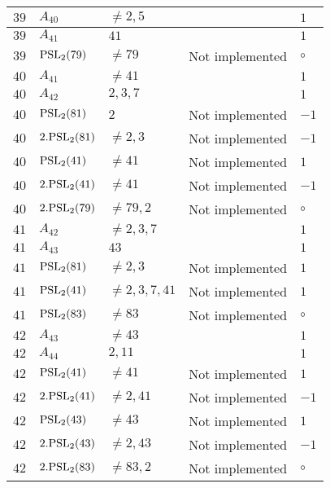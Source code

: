 \documentclass[a4paper, 11pt]{article}
\begin{document}
\begin{longtable}{lllll}
        $ 39 $ & $ A_{40} $ & $ \neq 2, 5 $ & $ ~ $ & $ 1  $ \\ \hline
        $ 39 $ & $ A_{41} $ & $ 41 $ & $ ~ $ & $ 1  $ \\ \hline
        $ 39 $ & $ {\rm PSL}_{2}(79) $ & $ \neq 79 $ & Not implemented & $\circ$ \\ \hline
        $ 40 $ & $ A_{41} $ & $ \neq 41 $ & $ ~ $ & $ 1  $ \\ \hline
        $ 40 $ & $ A_{42} $ & $ 2, 3, 7 $ & $ ~ $ & $ 1  $ \\ \hline
        $ 40 $ & $ {\rm PSL}_{2}(81) $ & $ 2 $ & Not implemented & $ -1  $ \\ \hline
        $ 40 $ & $ 2.{\rm PSL}_{2}(81) $ & $ \neq 2, 3 $ & Not implemented & $ -1  $ \\ \hline
        $ 40 $ & $ {\rm PSL}_{2}(41) $ & $ \neq 41 $ & Not implemented & $ 1  $ \\ \hline
        $ 40 $ & $ 2.{\rm PSL}_{2}(41) $ & $ \neq 41 $ & Not implemented & $ -1  $ \\ \hline
        $ 40 $ & $ 2.{\rm PSL}_{2}(79) $ & $ \neq 79, 2 $ & Not implemented & $\circ$ \\ \hline
        $ 41 $ & $ A_{42} $ & $ \neq 2, 3, 7 $ & $ ~ $ & $ 1  $ \\ \hline
        $ 41 $ & $ A_{43} $ & $ 43 $ & $ ~ $ & $ 1  $ \\ \hline
        $ 41 $ & $ {\rm PSL}_{2}(81) $ & $ \neq 2, 3 $ & Not implemented & $ 1  $ \\ \hline
        $ 41 $ & $ {\rm PSL}_{2}(41) $ & $ \neq 2, 3, 7, 41 $ & Not implemented & $ 1  $ \\ \hline
        $ 41 $ & $ {\rm PSL}_{2}(83) $ & $ \neq 83 $ & Not implemented & $\circ$ \\ \hline
        $ 42 $ & $ A_{43} $ & $ \neq 43 $ & $ ~ $ & $ 1  $ \\ \hline
        $ 42 $ & $ A_{44} $ & $ 2, 11 $ & $ ~ $ & $ 1  $ \\ \hline
        $ 42 $ & $ {\rm PSL}_{2}(41) $ & $ \neq 41 $ & Not implemented & $ 1  $ \\ \hline
        $ 42 $ & $ 2.{\rm PSL}_{2}(41) $ & $ \neq 2, 41 $ & Not implemented & $ -1  $ \\ \hline
        $ 42 $ & $ {\rm PSL}_{2}(43) $ & $ \neq 43 $ & Not implemented & $ 1  $ \\ \hline
        $ 42 $ & $ 2.{\rm PSL}_{2}(43) $ & $ \neq 2, 43 $ & Not implemented & $ -1  $ \\ \hline
        $ 42 $ & $ 2.{\rm PSL}_{2}(83) $ & $ \neq 83, 2 $ & Not implemented & $\circ$ \\ \hline

\end{longtable}
\end{document}
